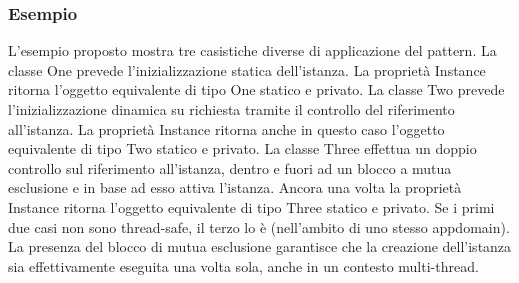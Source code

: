 \documentclass[a4paper,10pt]{article}
\begin{document}
                \subsubsection{Esempio}
                L’esempio proposto mostra tre casistiche diverse di applicazione del pattern. La classe One prevede l’inizializzazione statica dell’istanza. La proprietà Instance ritorna l’oggetto equivalente di tipo One statico e privato. La classe Two prevede l’inizializzazione dinamica su richiesta tramite il controllo del riferimento all’istanza. La proprietà Instance ritorna anche in questo caso l’oggetto equivalente di tipo Two statico e privato. La classe Three effettua un doppio controllo sul riferimento all’istanza, dentro e fuori ad un blocco a mutua esclusione e in base ad esso attiva l’istanza. Ancora una volta la proprietà Instance ritorna l’oggetto equivalente di tipo Three statico e privato. Se i primi due casi non sono thread-safe, il terzo lo è (nell’ambito di uno stesso appdomain). La presenza del blocco di mutua esclusione garantisce che la creazione dell’istanza sia effettivamente eseguita una volta sola, anche in un contesto multi-thread.
\end{document}
